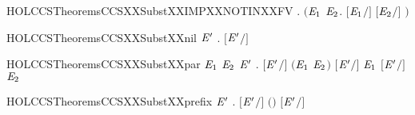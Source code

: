 \newcommand{\HOLCCSTheoremsCCSXXSubstXXelimXXIMPXXNOTIN}{\UseVerbatim{HOLCCSTheoremsCCSXXSubstXXelimXXIMPXXNOTIN}}
\begin{SaveVerbatim}{HOLCCSTheoremsCCSXXSubstXXIMPXXNOTINXXFV}
\HOLTokenTurnstile{} \HOLSymConst{\HOLTokenForall{}} . \ensuremath{(}\HOLSymConst{\HOLTokenForall{}}\ensuremath{\HOLBoundVar{E}\sb{\mathrm{1}}} \ensuremath{\HOLBoundVar{E}\sb{\mathrm{2}}}. \ensuremath{[}\ensuremath{\HOLBoundVar{E}\sb{\mathrm{1}}}\ensuremath{/}\ensuremath{]}  \HOLSymConst{\ensuremath{=}} \ensuremath{[}\ensuremath{\HOLBoundVar{E}\sb{\mathrm{2}}}\ensuremath{/}\ensuremath{]} \ensuremath{)} \HOLSymConst{\HOLTokenImp{}}  \HOLConst{\HOLTokenNotIn{}}  
\end{SaveVerbatim}
\newcommand{\HOLCCSTheoremsCCSXXSubstXXIMPXXNOTINXXFV}{\UseVerbatim{HOLCCSTheoremsCCSXXSubstXXIMPXXNOTINXXFV}}
\begin{SaveVerbatim}{HOLCCSTheoremsCCSXXSubstXXnil}
\HOLTokenTurnstile{} \HOLSymConst{\HOLTokenForall{}}\ensuremath{\HOLBoundVar{E}\sp{\prime{}}} . \ensuremath{[}\ensuremath{\HOLBoundVar{E}\sp{\prime{}}}\ensuremath{/}\ensuremath{]}  \HOLSymConst{\ensuremath{=}} 
\end{SaveVerbatim}
\newcommand{\HOLCCSTheoremsCCSXXSubstXXnil}{\UseVerbatim{HOLCCSTheoremsCCSXXSubstXXnil}}
\begin{SaveVerbatim}{HOLCCSTheoremsCCSXXSubstXXpar}
\HOLTokenTurnstile{} \HOLSymConst{\HOLTokenForall{}}\ensuremath{\HOLBoundVar{E}\sb{\mathrm{1}}} \ensuremath{\HOLBoundVar{E}\sb{\mathrm{2}}} \ensuremath{\HOLBoundVar{E}\sp{\prime{}}} . \ensuremath{[}\ensuremath{\HOLBoundVar{E}\sp{\prime{}}}\ensuremath{/}\ensuremath{]} \ensuremath{(}\ensuremath{\HOLBoundVar{E}\sb{\mathrm{1}}} \HOLSymConst{\ensuremath{\mid}} \ensuremath{\HOLBoundVar{E}\sb{\mathrm{2}}}\ensuremath{)} \HOLSymConst{\ensuremath{=}} \ensuremath{[}\ensuremath{\HOLBoundVar{E}\sp{\prime{}}}\ensuremath{/}\ensuremath{]} \ensuremath{\HOLBoundVar{E}\sb{\mathrm{1}}} \HOLSymConst{\ensuremath{\mid}} \ensuremath{[}\ensuremath{\HOLBoundVar{E}\sp{\prime{}}}\ensuremath{/}\ensuremath{]} \ensuremath{\HOLBoundVar{E}\sb{\mathrm{2}}}
\end{SaveVerbatim}
\newcommand{\HOLCCSTheoremsCCSXXSubstXXpar}{\UseVerbatim{HOLCCSTheoremsCCSXXSubstXXpar}}
\begin{SaveVerbatim}{HOLCCSTheoremsCCSXXSubstXXprefix}
\HOLTokenTurnstile{} \HOLSymConst{\HOLTokenForall{}}  \ensuremath{\HOLBoundVar{E}\sp{\prime{}}} . \ensuremath{[}\ensuremath{\HOLBoundVar{E}\sp{\prime{}}}\ensuremath{/}\ensuremath{]} \ensuremath{(}\HOLSymConst{\ensuremath{\ldotp}}\ensuremath{)} \HOLSymConst{\ensuremath{=}} \HOLSymConst{\ensuremath{\ldotp}}\ensuremath{[}\ensuremath{\HOLBoundVar{E}\sp{\prime{}}}\ensuremath{/}\ensuremath{]} 
\end{SaveVerbatim}
